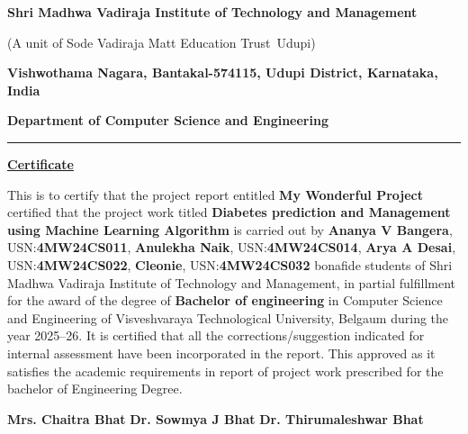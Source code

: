 \documentclass[12pt,a4paper]{report}
\begin{document}
\thispagestyle{empty}

\begin{mdframed}[linewidth=1pt]

\begin{center}

\textbf{Shri Madhwa Vadiraja Institute of Technology and Management}\\
\vspace{0.1cm}


(A unit of Sode Vadiraja Matt Education Trust\textregistered\ Udupi)\\


\vspace{0.1cm}

\textbf{\small Vishwothama Nagara, Bantakal-574115, Udupi District, Karnataka, India}\\

\vspace{0.3cm}

\textbf{Department of Computer Science and Engineering}\\
\rule{15cm}{0.1mm}


\underline{\large\textbf{Certificate}}\\


\end{center}

\justify

This is to certify that the project report entitled
\textbf{My Wonderful Project}
certified that the project work titled
\textbf{Diabetes prediction and Management using Machine Learning Algorithm}
is carried out by
\textbf{Ananya V Bangera}, USN:\textbf{4MW24CS011},
\textbf{Anulekha Naik}, USN:\textbf{4MW24CS014},
\textbf{Arya A Desai}, USN:\textbf{4MW24CS022},
\textbf{Cleonie}, USN:\textbf{4MW24CS032}
bonafide students of Shri Madhwa Vadiraja Institute of Technology and Management,
in partial fulfillment for the award of the degree of
\textbf{Bachelor of engineering}
in Computer Science and Engineering of
Visveshvaraya Technological University, Belgaum
during the year 2025--26.
It is certified that all the corrections/suggestion indicated for internal
assessment have been incorporated in the report.
This approved as it satisfies the academic requirements in report of
project work prescribed for the bachelor of Engineering Degree.

\vspace{4cm}
\vfill

\noindent

\begin{tabbing}
\textbf{\footnotesize Mrs. Chaitra Bhat}\hspace{2cm}
\=\textbf{\footnotesize Dr. Sowmya J Bhat}\hspace{2cm}
\=\textbf{\footnotesize Dr. Thirumaleshwar Bhat}\\


\end{tabbing}
\end{mdframed}
\end{document}
